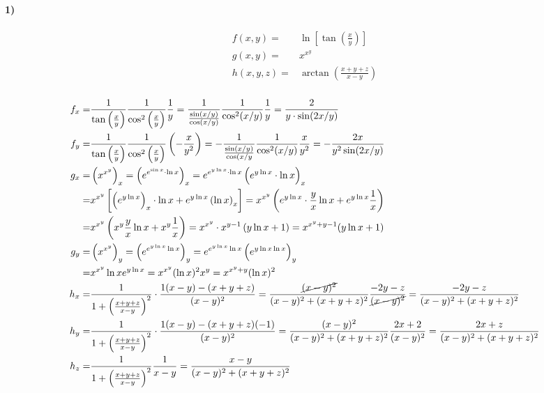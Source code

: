 \documentclass[11pt,a4paper,titlepage,draft]{article}
\begin{document}
\paragraph{1)}
\begin{align*}
f(x,y)=&\ln\left[\tan\left(\frac{x}{y}\right)\right]\\
g(x,y)=&x^{x^y}\\
h(x,y,z)=&\arctan\left(\frac{x+y+z}{x-y}\right)
\end{align*}
\subparagraph{}
\begin{align*}
f_x=&\frac{1}{\tan\left(\frac{x}{y}\right)}\frac{1}{\cos^2\left(\frac{x}{y}\right)}\frac{1}{y}=
\frac{1}{\frac{\sin(x/y)}{\cos(x/y)}}\frac{1}{\cos^2(x/y)}\frac{1}{y}=\frac{2}{y\cdot \sin(2x/y)}\\
f_y=&\frac{1}{\tan\left(\frac{x}{y}\right)}\frac{1}{\cos^2\left(\frac{x}{y}\right)}\left(-\frac{x}{y^2}\right)=-\frac{1}{\frac{\sin(x/y)}{\cos(x/y}}\frac{1}{\cos^2(x/y)}\frac{x}{y^2}=-\frac{2x}{y^2\sin(2x/y)}\\
g_x=&\left(x^{x^y}\right)_x=\left(e^{e^{\sin x} \cdot \ln x}\right)_x=
e^{e^{y\ln x} \cdot \ln x} \left( e^{y\ln x} \cdot \ln x\right)_x\\
=& x^{x^y} \left[
\left(e^{y\ln x}\right)_x\cdot \ln x + e^{y\ln x} \left( \ln x\right)_x
\right]
=
x^{x^y} \left(
e^{y\ln x} \cdot \frac{y}{x} \ln x + e^{y\ln x} \frac{1}{x}
\right)
\\=&
x^{x^y}\left(
x^y\frac{y}{x}\ln x+x^y\frac{1}{x}
\right)=x^{x^y}\cdot x^{y-1}\left(y\ln x+1\right) = x^{x^y+y-1}(y\ln x+1)
\\
g_y
=&
\left(
x^{x^y}
\right)_y
=
\left(
e^{e^{y\ln x}\ln x}
\right)_y
= e^{e^{y\ln x} \ln x} \left(e^{y\ln x \ln x}\right)_y
\\=&
x^{x^y}\ln x e^{y\ln x}=x^{x^y} (\ln x)^2 x^y = x^{x^y+y} (\ln x)^2
\\
h_x
=&
\frac{1}{1+\left(\frac{x+y+z}{x-y}\right)^2}
\cdot\frac{1(x-y)-(x+y+z)}{(x-y)^2}=\frac{\cancel{(x-y)^2}}{(x-y)^2+(x+y+z)^2}
\frac{-2y-z}{\cancel{(x-y)^2}}=\frac{-2y-z}{(x-y)^2+(x+y+z)^2}
\\
h_y
=&
\frac{1}{1+\left(\frac{x+y+z}{x-y}\right)^2}\cdot \frac{1(x-y)-(x+y+z)(-1)}{(x-y)^2}
= \frac{(x-y)^2}{(x-y)^2+(x+y+z)^2}\frac{2x+2}{(x-y)^2}=\frac{2x+z}{(x-y)^2+(x+y+z)^2}
\\
h_z
=&
\frac{1}{1+\left(\frac{x+y+z}{x-y}\right)^2}\frac{1}{x-y}=\frac{x-y}{(x-y)^2+(x+y+z)^2}
\end{align*}
\end{document}
